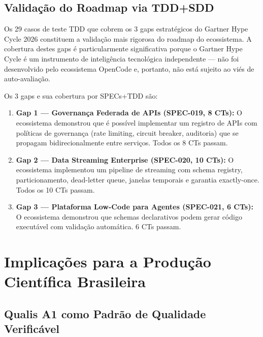 \subsection{Validação do Roadmap via TDD+SDD}

Os 29 casos de teste TDD que cobrem os 3 gaps estratégicos do Gartner Hype Cycle 2026 constituem a validação mais rigorosa do roadmap do ecossistema. A cobertura destes gaps é particularmente significativa porque o Gartner Hype Cycle é um instrumento de inteligência tecnológica independente --- não foi desenvolvido pelo ecossistema OpenCode e, portanto, não está sujeito ao viés de auto-avaliação.

Os 3 gaps e sua cobertura por SPECs+TDD são:

\begin{enumerate}
  \item \textbf{Gap 1 --- Governança Federada de APIs (SPEC-019, 8 CTs):} O ecossistema demonstrou que é possível implementar um registro de APIs com políticas de governança (rate limiting, circuit breaker, auditoria) que se propagam bidirecionalmente entre serviços. Todos os 8 CTs passam.
  \item \textbf{Gap 2 --- Data Streaming Enterprise (SPEC-020, 10 CTs):} O ecossistema implementou um pipeline de streaming com schema registry, particionamento, dead-letter queue, janelas temporais e garantia exactly-once. Todos os 10 CTs passam.
  \item \textbf{Gap 3 --- Plataforma Low-Code para Agentes (SPEC-021, 6 CTs):} O ecossistema demonstrou que schemas declarativos podem gerar código executável com validação automática. 6 CTs passam.
\end{enumerate}

\section{Implicações para a Produção Científica Brasileira}

\subsection{Qualis A1 como Padrão de Qualidade Verificável}

